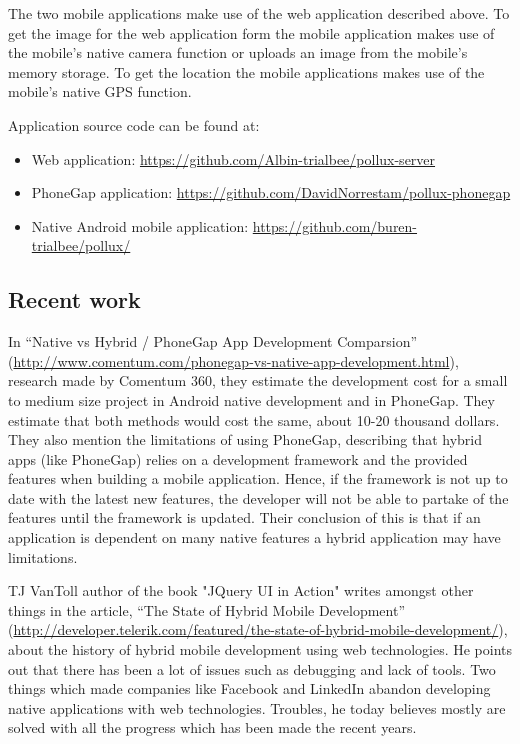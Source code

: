 The two mobile applications make use of the web application described above. To get the image for the web application form the mobile application makes use of the mobile's native camera function or uploads an image from the mobile's memory storage. To get the location the mobile applications makes use of the mobile's native GPS function. 

Application source code can be found at:
\begin{itemize}
  \item Web application: \url{https://github.com/Albin-trialbee/pollux-server}
  \item PhoneGap application: \url{https://github.com/DavidNorrestam/pollux-phonegap}
  \item Native Android mobile application: \url{https://github.com/buren-trialbee/pollux/}
\end{itemize}

\subsection{Recent work}
In “Native vs Hybrid / PhoneGap App Development Comparsion” (\url{http://www.comentum.com/phonegap-vs-native-app-development.html}), research made by Comentum 360, they estimate the development cost for a small to medium size project in Android native development and in PhoneGap. They estimate that both methods would cost the same, about 10-20 thousand dollars. They also mention the limitations of using PhoneGap, describing that hybrid apps (like PhoneGap) relies on a development framework and the provided features when building a mobile application. Hence, if the framework is not up to date with the latest new features, the developer will not be able to partake of the features until the framework is updated. Their conclusion of this is that if an application is dependent on many native features a hybrid application may have limitations. 

TJ VanToll author of the book "JQuery UI in Action" writes amongst other things in the article, “The State of Hybrid Mobile Development” (\url{http://developer.telerik.com/featured/the-state-of-hybrid-mobile-development/}), about the history of hybrid mobile development using web technologies. He points out that there has been a lot of issues such as debugging and lack of tools. Two things which made companies like Facebook and LinkedIn abandon developing native applications with web technologies. Troubles, he today believes mostly are solved with all the progress which has been made the recent years.